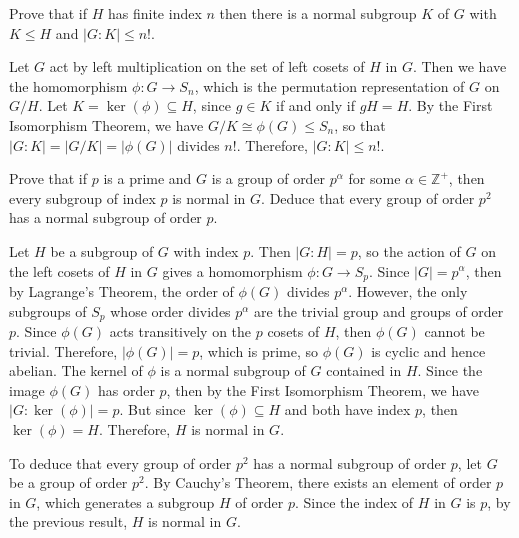 \begin{exercise}
	Prove that if $H$ has finite index $n$ then there is a normal subgroup $K$ of $G$ with $K \le H$ and $|G : K| \le n!$.
\end{exercise}

\begin{sol}
	Let $G$ act by left multiplication on the set of left cosets of $H$ in $G$. Then we have the homomorphism $\phi : G \to S_n$, which is the permutation representation of $G$ on $G/H$. Let $K = \ker(\phi) \subseteq H$, since $g \in K$ if and only if $gH = H$. By the First Isomorphism Theorem, we have $G/K \cong \phi(G) \leq S_n$, so that $|G : K| = |G/K| = |\phi(G)|$ divides $n!$. Therefore, $|G : K| \leq n!$.
\end{sol}

\newpage

\begin{exercise}
	Prove that if $p$ is a prime and $G$ is a group of order $p^\alpha$ for some $\alpha \in \mathbb{Z}^+$, then every subgroup of index $p$ is normal in $G$. Deduce that every group of order $p^2$ has a normal subgroup of order $p$.
\end{exercise}

\begin{sol}
	Let $H$ be a subgroup of $G$ with index $p$. Then $|G : H| = p$, so the action of $G$ on the left cosets of $H$ in $G$ gives a homomorphism $\phi : G \to S_p$. Since $|G| = p^\alpha$, then by Lagrange's Theorem, the order of $\phi(G)$ divides $p^\alpha$. However, the only subgroups of $S_p$ whose order divides $p^\alpha$ are the trivial group and groups of order $p$. Since $\phi(G)$ acts transitively on the $p$ cosets of $H$, then $\phi(G)$ cannot be trivial. Therefore, $|\phi(G)| = p$, which is prime, so $\phi(G)$ is cyclic and hence abelian. The kernel of $\phi$ is a normal subgroup of $G$ contained in $H$. Since the image $\phi(G)$ has order $p$, then by the First Isomorphism Theorem, we have $|G : \ker(\phi)| = p$. But since $\ker(\phi) \subseteq H$ and both have index $p$, then $\ker(\phi) = H$. Therefore, $H$ is normal in $G$.

	To deduce that every group of order $p^2$ has a normal subgroup of order $p$, let $G$ be a group of order $p^2$. By Cauchy's Theorem, there exists an element of order $p$ in $G$, which generates a subgroup $H$ of order $p$. Since the index of $H$ in $G$ is $p$, by the previous result, $H$ is normal in $G$.
\end{sol}

